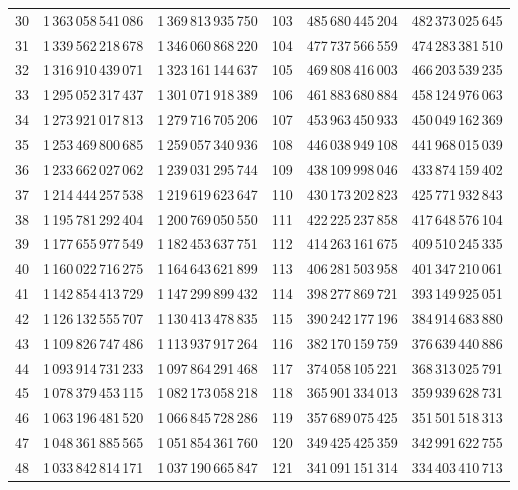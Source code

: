 \begin{longtable}{@{}r r r@{\qquad}r r r@{}}
30 & 1\,363\,058\,541\,086 & 1\,369\,813\,935\,750 & 103 & 485\,680\,445\,204 & 482\,373\,025\,645\\
31 & 1\,339\,562\,218\,678 & 1\,346\,060\,868\,220 & 104 & 477\,737\,566\,559 & 474\,283\,381\,510\\
32 & 1\,316\,910\,439\,071 & 1\,323\,161\,144\,637 & 105 & 469\,808\,416\,003 & 466\,203\,539\,235\\
33 & 1\,295\,052\,317\,437 & 1\,301\,071\,918\,389 & 106 & 461\,883\,680\,884 & 458\,124\,976\,063\\
34 & 1\,273\,921\,017\,813 & 1\,279\,716\,705\,206 & 107 & 453\,963\,450\,933 & 450\,049\,162\,369\\
35 & 1\,253\,469\,800\,685 & 1\,259\,057\,340\,936 & 108 & 446\,038\,949\,108 & 441\,968\,015\,039\\
36 & 1\,233\,662\,027\,062 & 1\,239\,031\,295\,744 & 109 & 438\,109\,998\,046 & 433\,874\,159\,402\\
37 & 1\,214\,444\,257\,538 & 1\,219\,619\,623\,647 & 110 & 430\,173\,202\,823 & 425\,771\,932\,843\\
38 & 1\,195\,781\,292\,404 & 1\,200\,769\,050\,550 & 111 & 422\,225\,237\,858 & 417\,648\,576\,104\\
39 & 1\,177\,655\,977\,549 & 1\,182\,453\,637\,751 & 112 & 414\,263\,161\,675 & 409\,510\,245\,335\\
40 & 1\,160\,022\,716\,275 & 1\,164\,643\,621\,899 & 113 & 406\,281\,503\,958 & 401\,347\,210\,061\\
41 & 1\,142\,854\,413\,729 & 1\,147\,299\,899\,432 & 114 & 398\,277\,869\,721 & 393\,149\,925\,051\\
42 & 1\,126\,132\,555\,707 & 1\,130\,413\,478\,835 & 115 & 390\,242\,177\,196 & 384\,914\,683\,880\\
43 & 1\,109\,826\,747\,486 & 1\,113\,937\,917\,264 & 116 & 382\,170\,159\,759 & 376\,639\,440\,886\\
44 & 1\,093\,914\,731\,233 & 1\,097\,864\,291\,468 & 117 & 374\,058\,105\,221 & 368\,313\,025\,791\\
45 & 1\,078\,379\,453\,115 & 1\,082\,173\,058\,218 & 118 & 365\,901\,334\,013 & 359\,939\,628\,731\\
46 & 1\,063\,196\,481\,520 & 1\,066\,845\,728\,286 & 119 & 357\,689\,075\,425 & 351\,501\,518\,313\\
47 & 1\,048\,361\,885\,565 & 1\,051\,854\,361\,760 & 120 & 349\,425\,425\,359 & 342\,991\,622\,755\\
48 & 1\,033\,842\,814\,171 & 1\,037\,190\,665\,847 & 121 & 341\,091\,151\,314 & 334\,403\,410\,713\\

\end{longtable}
